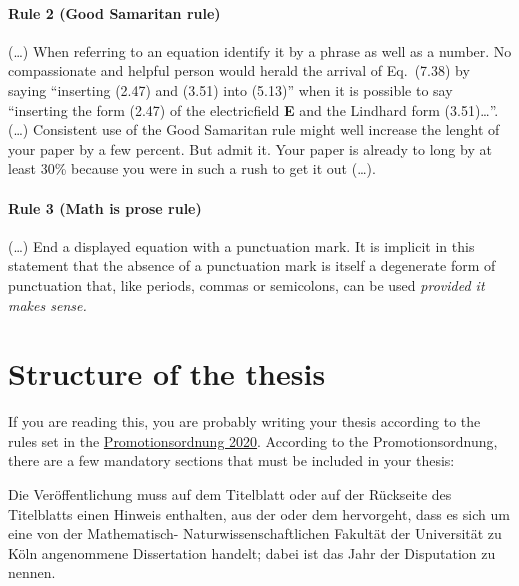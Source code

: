 \paragraph{Rule 2 (Good Samaritan rule)}(\dots) When referring to an equation identify it by a phrase as well as a number. No compassionate and helpful person would herald the arrival of Eq.~(7.38) by saying ``inserting (2.47) and (3.51) into (5.13)'' when it is possible to say ``inserting the form (2.47) of the electricfield \textbf{E} and the Lindhard form (3.51)\dots''. (\dots) Consistent use of the Good Samaritan rule might well increase the lenght of your paper by a few percent. But admit it. Your paper is already to long by at least 30\% because you were in such a rush to get it out (\ldots).
\paragraph{Rule 3 (Math is prose rule)} (\dots) End a displayed equation with a punctuation mark. It is implicit in this statement that the absence of a punctuation mark is itself a degenerate form of punctuation that, like periods, commas or semicolons, can be used \emph{provided it makes sense.}

\section{Structure of the thesis}

If you are reading this, you are probably writing your thesis according to the rules set in the \href{https://mathnat.uni-koeln.de/sites/dekanat/official/Ordnungen/Promotionsordnung_2020.pdf}{Promotionsordnung 2020}. 
According to the Promotionsordnung, there are a few mandatory sections that must be included in your thesis:

Die Veröffentlichung muss auf dem Titelblatt oder auf der Rückseite des Titelblatts einen
Hinweis enthalten, aus der oder dem hervorgeht, dass es sich um eine von der Mathematisch-
Naturwissenschaftlichen Fakultät der Universität zu Köln angenommene Dissertation handelt;
dabei ist das Jahr der Disputation zu nennen.


